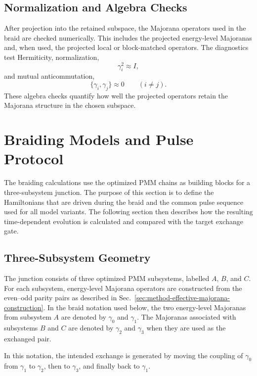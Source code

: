 \subsection{Normalization and Algebra Checks}
After projection into the retained subspace, the Majorana operators used in the braid are checked numerically. This includes the projected energy-level Majoranas and, when used, the projected local or block-matched operators. The diagnostics test Hermiticity, normalization,
\begin{equation}
\gamma_i^2 \approx I,
\end{equation}
and mutual anticommutation,
\begin{equation}
\{\gamma_i,\gamma_j\}\approx 0
\qquad (i\neq j).
\end{equation}
These algebra checks quantify how well the projected operators retain the Majorana structure in the chosen subspace.


\section{Braiding Models and Pulse Protocol}

The braiding calculations use the optimized PMM chains as building blocks for a three-subsystem junction. The purpose of this section is to define the Hamiltonians that are driven during the braid and the common pulse sequence used for all model variants. The following section then describes how the resulting time-dependent evolution is calculated and compared with the target exchange gate.

\subsection{Three-Subsystem Geometry}
The junction consists of three optimized PMM subsystems, labelled $A$, $B$, and $C$. For each subsystem, energy-level Majorana operators are constructed from the even--odd parity pairs as described in Sec.~\ref{sec:method-effective-majorana-construction}. In the braid notation used below, the two energy-level Majoranas from subsystem $A$ are denoted by $\gamma_0$ and $\gamma_1$. The Majoranas associated with subsystems $B$ and $C$ are denoted by $\gamma_2$ and $\gamma_3$ when they are used as the exchanged pair.


In this notation, the intended exchange is generated by moving the coupling of $\gamma_0$ from $\gamma_1$ to $\gamma_2$, then to $\gamma_3$, and finally back to $\gamma_1$.

